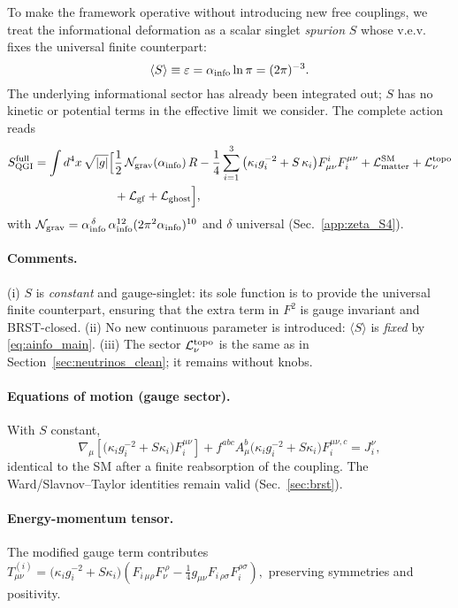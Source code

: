\documentclass{article}
\numberwithin{equation}{section}
\theoremstyle{plain}
\theoremstyle{definition}
\theoremstyle{remark}
\begin{document}
\noindent
To make the framework operative without introducing new free couplings, we treat the informational deformation as a scalar singlet \emph{spurion} $S$ whose v.e.v. fixes the universal finite counterpart:
\[
\langle S\rangle \equiv \varepsilon=\alpha_{\rm info}\ln\pi=(2\pi)^{-3}.
\]
The underlying informational sector has already been integrated out; $S$ has no kinetic or potential terms in the effective limit we consider. The complete action reads
\begin{equation}
\begin{aligned}
S_{\rm QGI}^{\rm full}
=\int d^4x\,\sqrt{|g|}\Big[
&\frac{1}{2}\,\mathcal{N}_{\rm grav}(\alpha_{\rm info})\,R
-\frac{1}{4}\sum_{i=1}^3 \big(\kappa_i g_i^{-2} + S\,\kappa_i\big) F^{i}_{\mu\nu}F_i^{\mu\nu}
+\mathcal{L}_{\rm matter}^{\rm SM}
+\mathcal{L}_{\nu}^{\rm topo}
\\
&+\mathcal{L}_{\rm gf}+\mathcal{L}_{\rm ghost}
\Big],
\end{aligned}
\label{eq:SQGI_full}
\end{equation}
with $\mathcal{N}_{\rm grav}=\alpha_{\rm info}^{\,\delta}\,\alpha_{\rm info}^{12}(2\pi^2\alpha_{\rm info})^{10}$ and $\delta$ universal (Sec.~\ref{app:zeta_S4}).

\paragraph{Comments.}
(i) $S$ is \emph{constant} and gauge-singlet: its sole function is to provide the universal finite counterpart, ensuring that the extra term in $F^2$ is gauge invariant and BRST-closed.
(ii) No new continuous parameter is introduced: $\langle S\rangle$ is \emph{fixed} by \eqref{eq:ainfo_main}.
(iii) The sector $\mathcal{L}_{\nu}^{\rm topo}$ is the same as in Section~\ref{sec:neutrinos_clean}; it remains without knobs.

\paragraph{Equations of motion (gauge sector).}
With $S$ constant,
\begin{equation}
\nabla_\mu\!\left[\Big(\kappa_i g_i^{-2}+S\kappa_i\Big) F_i^{\mu\nu}\right]
+ f^{abc} A^b_\mu \Big(\kappa_i g_i^{-2}+S\kappa_i\Big) F^{\mu\nu,c}_i
= J^{\nu}_i,
\end{equation}
identical to the SM after a finite reabsorption of the coupling. The Ward/Slavnov–Taylor identities remain valid (Sec.~\ref{sec:brst}).

\paragraph{Energy-momentum tensor.}
The modified gauge term contributes
\(
T_{\mu\nu}^{(i)}=\big(\kappa_i g_i^{-2}+S\kappa_i\big)\left(F_{i\,\mu\rho} F_\nu^{\ \rho} - \tfrac14 g_{\mu\nu}F_{i\,\rho\sigma}F^{\rho\sigma}_i\right),
\)
preserving symmetries and positivity.
\end{document}
